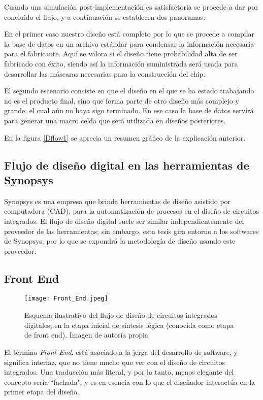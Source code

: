 Cuando una simulación post-implementación es satisfactoria se procede a dar por concluido el flujo, y a continuación se establecen dos panoramas:

En el primer caso nuestro diseño está completo por lo que se procede a compilar la base de datos en un archivo estándar para condensar la información necesaria para el fabricante. Aquí se valora si el diseño tiene probabilidad alta de ser fabricado con éxito, siendo así la información suministrada será usada para desarrollar las máscaras necesarias para la construcción del chip.

El segundo escenario consiste en que el diseño en el que se ha estado trabajando no es el producto final, sino que forma parte de otro diseño más complejo y grande, el cual aún no haya sigo terminado. En ese caso la base de datos servirá para generar una macro celda que será utilizada en diseños posteriores.

En la figura \ref{Dflow1} se aprecia un resumen gráfico de la explicación anterior.

\subsection{Flujo de diseño digital en las herramientas de Synopsys}

Synopsys es una empresa que brinda herramientas de diseño asistido por computadora (CAD), para la automatización de procesos en el diseño de circuitos integrados. El flujo de diseño digital suele ser similar independientemente del proveedor de las herramientas; sin embargo, esta tesis gira entorno a los softwares de Synopsys, por lo que se expondrá la metodología de diseño usando este proveedor.

\subsection{Front End}

\begin{figure}[h]
\texttt{[image: Front\_End.jpeg]}
\centering
\caption{Esquema ilustrativo del flujo de diseño de circuitos integrados digitales, en la etapa inicial de síntesis lógica (conocida como etapa de front end). Imagen de autoría propia}
\label{fe}
\end{figure}


El término \textit{Front End}, está asociado a la jerga del desarrollo de software, y significa interfaz, que no tiene mucho que ver con el diseño de circuitos integrados. Una traducción más literal, y por lo tanto, menos elegante del concepto sería ``fachada", y es en esencia con lo que el diseñador interactúa en la primer etapa del diseño.

